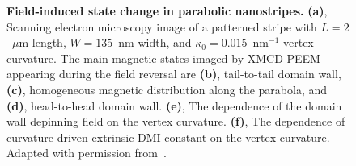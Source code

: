 \begin{figure}[b]
	\caption{\textbf{Field-induced state change in parabolic nanostripes.} \textbf{(a)}, Scanning electron microscopy image of a patterned stripe with $L=2$~$\mu$m length, $W=135$~nm width, and $\kappa_0=0.015$~nm$^{-1}$ vertex curvature. The main magnetic states imaged by XMCD-PEEM appearing during the field reversal are \textbf{(b)}, tail-to-tail domain wall, \textbf{(c)}, homogeneous magnetic distribution along the parabola, and \textbf{(d)}, head-to-head domain wall. \textbf{(e)}, The dependence of the domain wall depinning field on the vertex curvature. \textbf{(f)}, The dependence of curvature-driven extrinsic DMI constant on the vertex curvature. Adapted with permission from~\cite{Volkov19c}.}
	\label{fig:Experiment_parabola}
\end{figure}

